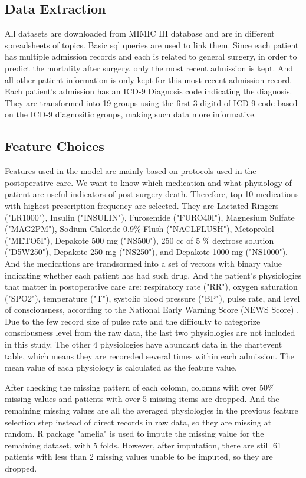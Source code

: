 \documentclass[twoside,11pt]{article}
\begin{document}
\subsection{Data Extraction} 
All datasets are downloaded from MIMIC III database and are in different spreadsheets of topics. Basic sql queries are used to link them. Since each patient has multiple admission records and each is related to general surgery, in order to predict the mortality after surgery, only the most recent admission is kept. And all other patient information is only kept for this most recent admission record. Each patient's admission has an ICD-9 Diagnosis code indicating the diagnosis. They are transformed into 19 groups using the first 3 digitd of ICD-9 code based on the ICD-9 diagnositic groups, making such data more informative.

\subsection{Feature Choices} 
Features used in the model are mainly based on protocols used in the postoperative care. We want to know which medication and what physiology of patient are useful indicators of post-surgery death. Therefore, top 10 medications with highest prescription frequency are selected. They are Lactated Ringers ("LR1000"), Insulin ("INSULIN"), Furosemide ("FURO40I"), Magnesium Sulfate ("MAG2PM"), Sodium Chloride 0.9\% Flush ("NACLFLUSH"), Metoprolol ("METO5I"), Depakote 500 mg ("NS500"), 250 cc of 5 \% dextrose solution ("D5W250"), Depakote 250 mg ("NS250"), and Depakote 1000 mg ("NS1000"). And the medications are trandsormed into a set of vectors with binary value indicating whether each patient has had such drug. And the patient's physiologies that matter in postoperative care are: respiratory rate ("RR"), oxygen saturation ("SPO2"), temperature ("T"), systolic blood pressure ("BP"), pulse rate, and level of consciousness, according to the National Early Warning Score (NEWS Score) \citet{cite6}. Due to the few record size of pulse rate and the difficulty to categorize consciousness level from the raw data, the last two physiologies are not included in this study. The other 4 physiologies have abundant data in the chartevent table, which means they are recoreded several times within each admission. The mean value of each physiology is calculated as the feature value. 

After checking the missing pattern of each colomn, colomns with over 50\% missing values and patients with over 5 missing items are dropped. And the remaining missing values are all the averaged physiologies in the previous feature selection step instead of direct records in raw data, so they are missing at random. R package "amelia" is used to impute the missing value for the remaining dataset, with 5 folds. However, after imputation, there are still 61 patients with less than 2 missing values unable to be imputed, so they are dropped.
\end{document}

